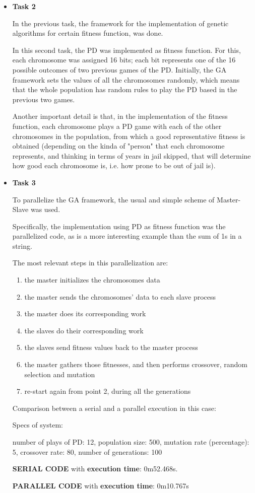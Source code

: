 \documentclass[paper=a4, fontsize=11pt]{scrartcl} %
\numberwithin{equation}{section} %
\numberwithin{figure}{section} %
\numberwithin{table}{section} %
\begin{document}
\begin{itemize}
\item \textbf{Task 2}

In the previous task, the framework for the implementation of genetic algorithms for certain fitness function, was done.

In this second task, the PD was implemented as fitness function. For this, each chromosome was assigned 16 bits; each bit represents one of the 16 possible outcomes of two previous games of the PD. Initially, the GA framework sets the values of all the chromosomes randomly, which means that the whole population has random rules to play the PD based in the previous two games.

Another important detail is that, in the implementation of the fitness function, each chromosome plays a PD game with each of the other chromosomes in the population, from which a good representative fitness is obtained (depending on the kinda of "person" that each chromosome represents, and thinking in terms of years in jail skipped, that will determine how good each chromosome is, i.e. how prone to be out of jail is).




\item \textbf{Task 3}

To parallelize the GA framework, the usual and simple scheme of Master-Slave was used.

Specifically, the implementation using PD as fitness function was the parallelized code, as is a more interesting example than the sum of 1s in a string.

The most relevant steps in this parallelization are:

\begin{enumerate}
\item the master initializes the chromosomes data
\item the master sends the chromosomes' data to each slave process
\item the master does its corresponding work
\item the slaves do their corresponding work
\item the slaves send fitness values back to the master process
\item the master gathers those fitnesses, and then performs crossover, random selection and mutation
\item re-start again from point 2, during all the generations
\end{enumerate}

Comparison between a serial and a parallel execution in this case:

Specs of system:

number of plays of PD: 12, population size: 500, mutation rate (percentage): 5, crossover rate: 80, number of generations: 100
       
\textbf{SERIAL CODE} with \textbf{execution time}: 0m52.468s.

\textbf{PARALLEL CODE} with \textbf{execution time}: 0m10.767s





\end{itemize}
\end{document}
